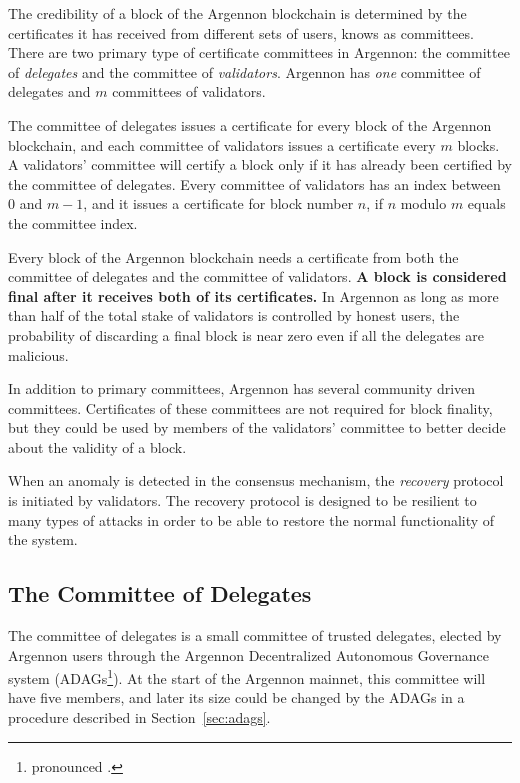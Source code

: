 
The credibility of a block of the Argennon blockchain is determined by the certificates it has received
from different sets of users, knows as committees. There are two primary type of certificate committees in
Argennon: the committee of \emph{delegates} and the committee
of \emph{validators}. Argennon has \emph{one} committee of delegates and $m$ committees of validators.

The committee of delegates issues a certificate for every block of the Argennon blockchain, and each
committee of validators issues a certificate every $m$ blocks. A validators' committee will
certify a block only if it has already been certified by the committee of delegates. Every committee of validators has
an index between $0$ and $m - 1$, and it issues a certificate for block number $n$, if $n$ modulo $m$ equals
the committee index.

Every block of the Argennon blockchain needs a certificate from both the committee of delegates and
the committee of validators. \textbf{A block is considered final after it receives both of
its certificates.} In Argennon as long as more than half of the total stake of validators is controlled by honest users,
the probability of discarding a final block is near zero even if all the delegates are malicious.

In addition to primary committees, Argennon has several community driven committees. Certificates of these
committees are not required for block finality, but they could be used by members of the
validators' committee to better decide about the validity of a block.

When an anomaly is detected in the consensus mechanism, the \emph{recovery} protocol is initiated by validators. The
recovery protocol is designed to be resilient to many types of attacks in order to be able to restore the normal
functionality of the system.

\subsection{The Committee of Delegates}\label{subsec:the-committee-of-delegates}

The committee of delegates is a small committee of trusted delegates, elected by Argennon users through the
Argennon Decentralized Autonomous Governance system (ADAGs\footnote{pronounced .}).
At the start of the Argennon mainnet, this committee will have
five members, and later its size could be changed by the ADAGs in a procedure described
in Section~\ref{sec:adags}.

